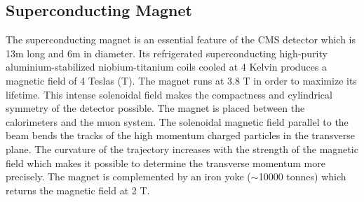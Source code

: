 \subsection{Superconducting Magnet}
The superconducting magnet is an essential feature of the CMS detector which is 13m long and 6m in diameter. Its refrigerated superconducting high-purity aluminium-stabilized niobium-titanium coils cooled at 4 Kelvin produces a magnetic field of 4 Teslas (T). The magnet runs at 3.8 T in order to maximize its lifetime. This intense solenoidal field makes the compactness and cylindrical symmetry of the detector possible. The magnet is placed between the calorimeters and the muon system. The solenoidal magnetic field parallel to the beam bends the tracks of the high momentum charged particles in the transverse plane. The curvature of the trajectory increases with the strength of the magnetic field which makes it possible to determine the transverse momentum more precisely. The magnet is complemented by an iron yoke ($\sim$10000 tonnes) which returns the magnetic field at 2 T.

